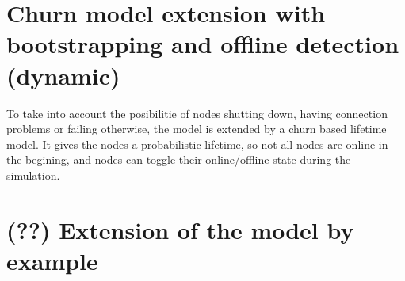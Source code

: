 \section{Churn model extension with bootstrapping and offline detection (dynamic)}

To take into account the posibilitie of nodes shutting down, having connection problems or failing otherwise, the model is extended by a churn based lifetime model. It gives the nodes a probabilistic lifetime, so not all nodes are online in the begining, and nodes can toggle their online/offline state during the simulation.

\section{(??) Extension of the model by example}
